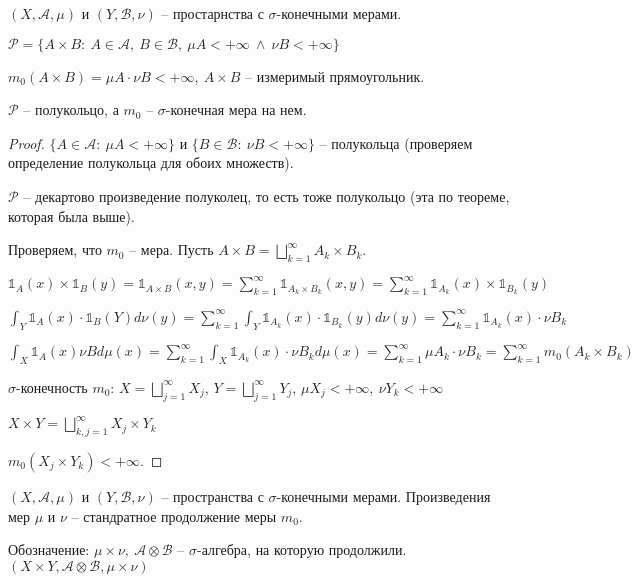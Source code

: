 \begin{definition}
    $\left(X, \mathcal{A}, \mu\right)$ и $\left(Y, \mathcal{B}, \nu\right)$ -- простарнства с $\sigma$-конечными мерами.

    $\mathcal{P} = \{ A \times B : \ A \in \mathcal{A}, \ B \in \mathcal{B}, \ \mu A < +\infty \  \land \ \nu B < +\infty \}$

    $m_0 (A \times B) = \mu A \cdot \nu B < +\infty, \ A \times B$ -- измеримый прямоугольник.
\end{definition}
\begin{theorem}
    $\mathcal{P}$ -- полукольцо, а $m_0$ -- $\sigma$-конечная мера на нем.
\end{theorem}
\begin{proof}
    $\{ A \in \mathcal{A}: \ \mu A < +\infty \}$ и $\{ B \in \mathcal{B}: \ \nu B < +\infty \}$ -- полукольца (проверяем определение полукольца для обоих множеств).

    $\mathcal{P}$ -- декартово произведение полуколец, то есть тоже полукольцо (эта по теореме, которая была выше).

    Проверяем, что $m_0$ -- мера. Пусть $A \times B = \bigsqcup_{k=1}^{\infty} A_k \times B_k$.

    $\mathds{1}_A(x) \times \mathds{1}_B(y) = \mathds{1}_{A \times B} (x, y) = \sum_{k=1}^{\infty} \mathds{1}_{A_k \times B_k} (x, y) = \sum_{k=1}^{\infty} \mathds{1}_{A_k}(x) \times \mathds{1}_{B_k}(y)$

    $\int_Y {\mathds{1}_A(x) \cdot \mathds{1}_B(Y) d \nu (y)} = \sum_{k=1}^{\infty} \int_Y{\mathds{1}_{A_k}(x) \cdot \mathds{1}_{B_k}(y) d \nu (y)} = \sum_{k=1}^{\infty} \mathds{1}_{A_k} (x) \cdot \nu B_k$

    $\int_X {\mathds{1}_A(x) \nu B d \mu(x)} = \sum_{k=1}^{\infty} \int_{X} {\mathds{1}_{A_k}(x) \cdot \nu B_k d \mu (x)} = \sum_{k=1}^{\infty} \mu A_k \cdot \nu B_k = \sum_{k=1}^{\infty} m_0 (A_k \times B_k)$

    $\sigma$-конечность $m_0$: $X = \bigsqcup_{j=1}^{\infty} X_j$, $Y = \bigsqcup_{j=1}^{\infty} Y_j$, $\mu X_j < +\infty, \ \nu Y_k < +\infty$

    $X \times Y = \bigsqcup_{k, j = 1}^{\infty} X_j \times Y_k$

    $m_0 (X_j \times Y_k) < +\infty$.
\end{proof}

\begin{definition}
    $(X, \mathcal{A}, \mu)$ и $(Y, \mathcal{B}, \nu)$ -- пространства с $\sigma$-конечными мерами. Произведения мер $\mu$ и $\nu$ -- стандратное продолжение меры $m_0$.

    Обозначение: $\mu \times \nu, \ \mathcal{A} \otimes \mathcal{B}$ -- $\sigma$-алгебра, на которую продолжили. $(X \times Y, \mathcal{A} \otimes \mathcal{B}, \mu \times \nu)$
\end{definition}

